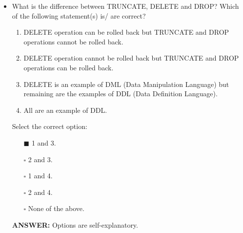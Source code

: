 \documentclass[10pt]{article}
\begin{document}
\begin{itemize}
		\item What is the difference between TRUNCATE, DELETE and DROP? Which of the following statement(s) is/ are correct?
			\begin{enumerate}
				\item DELETE operation can be rolled back but TRUNCATE and DROP operations cannot be rolled back.
				\item DELETE operation cannot be rolled back but TRUNCATE and DROP operations can be rolled back.
				\item DELETE is an example of DML (Data Manipulation Language) but remaining are the examples of DDL (Data Definition Language).
				\item All are an example of DDL.
			\end{enumerate}
			Select the correct option:
			\begin{enumerate}
				\item[$\blacksquare$] 1 and 3.
				\item[$\square$] 2 and 3.
				\item[$\square$] 1 and 4.
				\item[$\square$] 2 and 4.
				\item[$\square$] None of the above.
			\end{enumerate}
			\color{red} \textbf{ANSWER:} \color{black} Options are self-explanatory.

		\newpage


\end{itemize}
\end{document}
